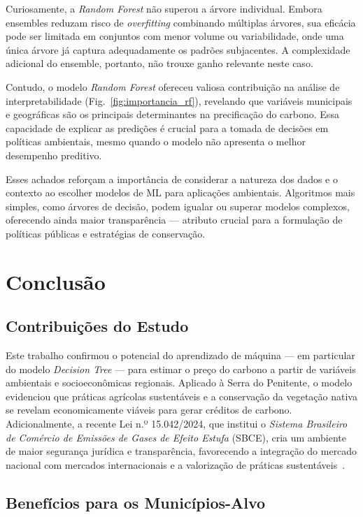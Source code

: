 \documentclass[conference]{IEEEtran}
\begin{document}
Curiosamente, a \emph{Random Forest} não superou a árvore individual.  
Embora ensembles reduzam risco de \emph{overfitting} combinando múltiplas árvores, sua eficácia pode ser limitada em conjuntos com menor volume ou variabilidade, onde uma única árvore já captura adequadamente os padrões subjacentes.  
A complexidade adicional do ensemble, portanto, não trouxe ganho relevante neste caso.

Contudo, o modelo \emph{Random Forest} ofereceu valiosa contribuição na análise de interpretabilidade (Fig.~\ref{fig:importancia_rf}), revelando que variáveis municipais e geográficas são os principais determinantes na precificação do carbono.  
Essa capacidade de explicar as predições é crucial para a tomada de decisões em políticas ambientais, mesmo quando o modelo não apresenta o melhor desempenho preditivo.

Esses achados reforçam a importância de considerar a natureza dos dados e o contexto ao escolher modelos de ML para aplicações ambientais.  
Algoritmos mais simples, como árvores de decisão, podem igualar ou superar modelos complexos, oferecendo ainda maior transparência — atributo crucial para a formulação de políticas públicas e estratégias de conservação.


\section{Conclusão}\label{sec:conclusao}

\subsection{Contribuições do Estudo}

Este trabalho confirmou o potencial do aprendizado de máquina — em particular do modelo \emph{Decision Tree} — para estimar o preço do carbono a partir de variáveis ambientais e socioeconômicas regionais.  
Aplicado à Serra do Penitente, o modelo evidenciou que práticas agrícolas sustentáveis e a conservação da vegetação nativa se revelam economicamente viáveis para gerar créditos de carbono.  
Adicionalmente, a recente Lei n.º 15.042/2024, que institui o \emph{Sistema Brasileiro de Comércio de Emissões de Gases de Efeito Estufa} (SBCE), cria um ambiente de maior segurança jurídica e transparência, favorecendo a integração do mercado nacional com mercados internacionais e a valorização de práticas sustentáveis~\cite{caccavali2025}.

\subsection{Benefícios para os Municípios-Alvo}
\end{document}
